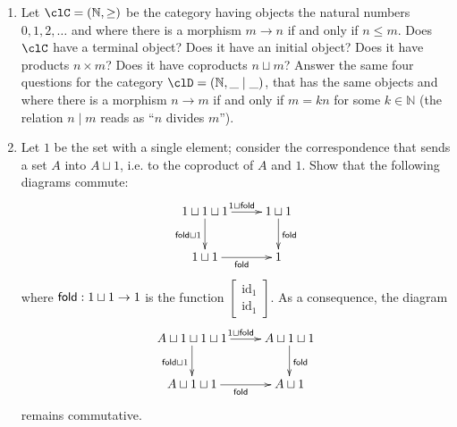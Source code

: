 \documentclass[11pt]{article}
\begin{document}
\footnotesize
\begin{enumerate}
	\item Let $\clC=(\mathbb N, \ge)$ be the category having objects the natural numbers $0,1,2,\dots$ and where there is a morphism $m\to n$ if and only if $n\le m$. Does $\clC$ have a terminal object? Does it have an initial object? Does it have products $n\times m$? Does it have coproducts $n\sqcup m$? Answer the same four questions for the category $\clD=(\mathbb N, \_\mid\_)$, that has the same objects and where there is a morphism $n\to m$ if and only if $m = kn$ for some $k\in\mathbb N$ (the relation $n\mid m$ reads as ``$n$ divides $m$'').

	\item Let \(1\) be the set with a single element; consider the correspondence that sends a set \(A\) into \(A\sqcup 1\), i.e. to the coproduct of \(A\) and \(1\). Show that the following diagrams commute:
	      \[ \vcenter{\xymatrix{
				      1\sqcup 1\sqcup 1\ar[r]^{1\sqcup \fold}\ar[d]_{\fold \sqcup 1} & 1\sqcup 1\ar[d]^{\fold} \\
				      1\sqcup 1\ar[r]_{\fold}& 1
			      }} \]
	      where \({\sf fold} : 1 \sqcup 1\to 1\) is the function \(\left[\begin{smallmatrix} \text{id}_1 \\ \text{id}_1 \end{smallmatrix}\right]\). As a consequence, the diagram
	      \[ \vcenter{\xymatrix{
				      A\sqcup 1\sqcup 1\sqcup 1\ar[r]^{1\sqcup \fold}\ar[d]_{\fold \sqcup 1} & A\sqcup 1\sqcup 1\ar[d]^{\fold} \\
				      A\sqcup 1\sqcup 1\ar[r]_{\fold}& A\sqcup 1
			      }} \]
	      remains commutative.


\end{enumerate}
\end{document}

